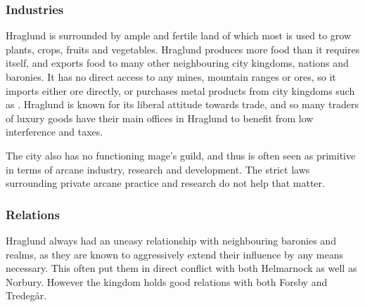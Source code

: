 \subsubsection{Industries}

Hraglund is surrounded by ample and fertile land of which most is used to
grow plants, crops, fruits and vegetables. Hraglund produces more food than
it requires itself, and exports food to many other neighbouring city kingdoms,
nations and baronies. It has no direct access to any mines, mountain ranges or
ores, so it imports either ore directly, or purchases metal products from
city kingdoms such as . Hraglund is known for its liberal
attitude towards trade, and so many traders of luxury goods have their main
offices in Hraglund to benefit from low interference and taxes.

The city also has no functioning mage's guild, and thus is often seen as
primitive in terms of arcane industry, research and development. The strict
laws surrounding private arcane practice and research do not help that matter.

\subsubsection{Relations}

Hraglund always had an uneasy relationship with neighbouring baronies and
realms, as they are known to aggressively extend their influence by any means
necessary. This often put them in direct conflict with both Helmarnock as well
as Norbury. However the kingdom holds good relations with both Forsby and
Tredegår.
